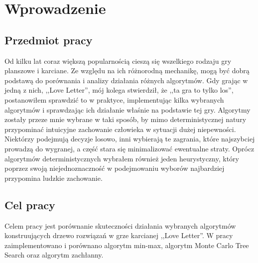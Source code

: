 \chapter{Wprowadzenie}
\label{cha:rozdz1}
\section{Przedmiot pracy}
\label{sec:przedmiotPracy}

Od kilku lat coraz większą popularnością cieszą się wszelkiego rodzaju gry planszowe i karciane. Ze względu na ich różnorodną mechanikę, mogą być dobrą podstawą do porównania i analizy działania różnych algorytmów. Gdy grając w jedną z nich, ,,Love Letter'', mój kolega stwierdził, że ,,ta gra to tylko los'', postanowiłem sprawdzić to w praktyce, implementując kilka wybranych algorytmów i sprawdzając ich działanie właśnie na podstawie tej gry. 
Algorytmy zostały przeze mnie wybrane w taki sposób, by mimo deterministycznej natury przypominać intuicyjne zachowanie człowieka w sytuacji dużej niepewności. Niektórzy podejmują decyzje losowo, inni wybierają te zagrania, które najszybciej prowadzą do wygranej, a część stara się minimalizować ewentualne straty. Oprócz algorytmów deterministycznych wybrałem również jeden heurystyczny, który poprzez swoją niejednoznaczność w podejmowaniu wyborów najbardziej przypomina ludzkie zachowanie.

\section{Cel pracy}
\label{sec:celPracy}
Celem pracy jest porównanie skuteczności działania wybranych algorytmów konstruujących drzewo rozwiązań w grze karcianej ,,Love Letter''. W pracy zaimplementowano i porównano algorytm min-max, algorytm Monte Carlo Tree Search oraz algorytm zachłanny.

